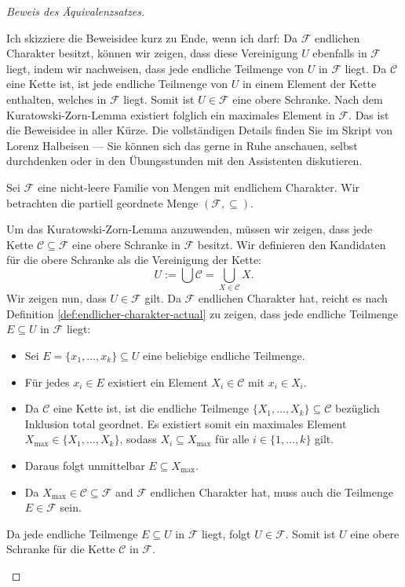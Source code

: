 \begin{proof}[Beweis des Äquivalenzsatzes]
\begin{spoken-clean}[01:24:00 - 01:26:34]
Ich skizziere die Beweisidee kurz zu Ende, wenn ich darf: Da $\mathcal{F}$ endlichen Charakter besitzt, können wir zeigen, dass diese Vereinigung $U$ ebenfalls in $\mathcal{F}$ liegt, indem wir nachweisen, dass jede endliche Teilmenge von $U$ in $\mathcal{F}$ liegt. Da $\mathcal{C}$ eine Kette ist, ist jede endliche Teilmenge von $U$ in einem Element der Kette enthalten, welches in $\mathcal{F}$ liegt. Somit ist $U \in \mathcal{F}$ eine obere Schranke. Nach dem Kuratowski-Zorn-Lemma existiert folglich ein maximales Element in $\mathcal{F}$. Das ist die Beweisidee in aller Kürze. Die vollständigen Details finden Sie im Skript von Lorenz Halbeisen --- Sie können sich das gerne in Ruhe anschauen, selbst durchdenken oder in den Übungsstunden mit den Assistenten diskutieren.
\end{spoken-clean}

\begin{math-stroke}
\begin{short-proof}
Sei $\mathcal{F}$ eine nicht-leere Familie von Mengen mit endlichem Charakter. Wir betrachten die partiell geordnete Menge $(\mathcal{F}, \subseteq)$. 

Um das Kuratowski-Zorn-Lemma anzuwenden, müssen wir zeigen, dass jede Kette $\mathcal{C} \subseteq \mathcal{F}$ eine obere Schranke in $\mathcal{F}$ besitzt. Wir definieren den Kandidaten für die obere Schranke als die Vereinigung der Kette:
\[
U := \bigcup \mathcal{C} = \bigcup_{X \in \mathcal{C}} X.
\]
Wir zeigen nun, dass $U \in \mathcal{F}$ gilt. Da $\mathcal{F}$ endlichen Charakter hat, reicht es nach Definition \ref{def:endlicher-charakter-actual} zu zeigen, dass jede endliche Teilmenge $E \subseteq U$ in $\mathcal{F}$ liegt:
\begin{itemize}
    \item Sei $E = \{x_1, \dots, x_k\} \subseteq U$ eine beliebige endliche Teilmenge.
    \item Für jedes $x_i \in E$ existiert ein Element $X_i \in \mathcal{C}$ mit $x_i \in X_i$.
    \item Da $\mathcal{C}$ eine Kette ist, ist die endliche Teilmenge $\{X_1, \dots, X_k\} \subseteq \mathcal{C}$ bezüglich Inklusion total geordnet. Es existiert somit ein maximales Element $X_{\max} \in \{X_1, \dots, X_k\}$, sodass $X_i \subseteq X_{\max}$ für alle $i \in \{1, \dots, k\}$ gilt.
    \item Daraus folgt unmittelbar $E \subseteq X_{\max}$.
    \item Da $X_{\max} \in \mathcal{C} \subseteq \mathcal{F}$ and $\mathcal{F}$ endlichen Charakter hat, muss auch die Teilmenge $E \in \mathcal{F}$ sein.
\end{itemize}
Da jede endliche Teilmenge $E \subseteq U$ in $\mathcal{F}$ liegt, folgt $U \in \mathcal{F}$. Somit ist $U$ eine obere Schranke für die Kette $\mathcal{C}$ in $\mathcal{F}$.


\end{short-proof}
\end{math-stroke}
\end{proof}
